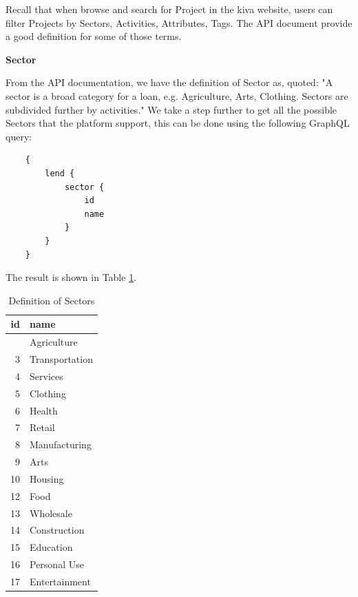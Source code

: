 Recall that when browse and search for Project in the kiva website,
users can filter Projects by Sectors, Activities, Attributes, Tags.
The API document provide a good definition for some of those terms.

\textbf{Sector}

From the API documentation, we have the definition of Sector as, quoted:
"A sector is a broad category for a loan, e.g. Agriculture, Arts, Clothing. Sectors are subdivided further by activities."
We take a step further to get all the possible Sectors that the platform support,
this can be done using the following GraphQL query:

\begin{lstlisting}
    {
        lend {
            sector {
                id
                name
            }
        }
    }
\end{lstlisting}

The result is shown in Table \ref{tab:sector-definition}.

\begin{longtable}[]{@{}rl@{}}
    \caption{Definition of Sectors}
    \label{tab:sector-definition} \\
    \toprule\noalign{}
    id & name                     \\
    \midrule\noalign{}
    \endhead
    \bottomrule\noalign{}
    \endlastfoot
    1  & Agriculture              \\
    3  & Transportation           \\
    4  & Services                 \\
    5  & Clothing                 \\
    6  & Health                   \\
    7  & Retail                   \\
    8  & Manufacturing            \\
    9  & Arts                     \\
    10 & Housing                  \\
    12 & Food                     \\
    13 & Wholesale                \\
    14 & Construction             \\
    15 & Education                \\
    16 & Personal Use             \\
    17 & Entertainment            \\
\end{longtable}

